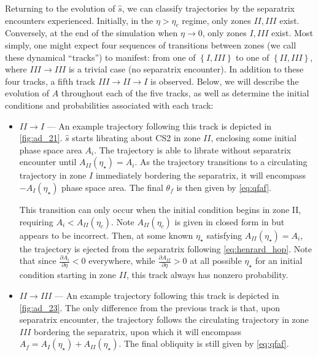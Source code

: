 \documentclass[
        fleqn,
        usenatbib,
    ]{mnras}
\newcommand*{\pd}[2]{\frac{\partial#1}{\partial#2}}
\newcommand*{\z}[1]{\left\{#1\right\}}
\begin{document}
Returning to the evolution of $\hat{s}$, we can classify trajectories by the
separatrix encounters experienced. Initially, in the $\eta > \eta_c$ regime,
only zones $II, III$ exist. Conversely, at the end of the simulation when $\eta
\to 0$, only zones $I, III$ exist. Most simply, one might expect four sequences
of transitions between zones (we call these dynamical ``tracks'') to manifest:
from one of $\z{I, III}$ to one of $\z{II, III}$, where $III \to III$ is a
trivial case (no separatrix encounter). In addition to these four tracks, a
fifth track $III \to II \to I$ is observed. Below, we will describe the
evolution of $A$ throughout each of the five tracks, as well as determine the
initial conditions and probabilities associated with each track:
\begin{itemize}
    \item $II \to I$ --- An example trajectory following this track is depicted
        in \autoref{fig:ad_21}. $\hat{s}$ starts librating about CS2 in zone
        $II$, enclosing some initial phase space area $A_i$. The trajectory is
        able to librate without separatrix encounter until $A_{II}(\eta_\star) =
        A_i$. As the trajectory transitions to a circulating trajectory in zone
        $I$ immediately bordering the separatrix, it will encompass
        $-A_I(\eta_\star)$ phase space area. The final $\theta_f$ is then given
        by \autoref{eq:qfaf}.

        This transition can only occur when the initial condition begins in zone
        II, requiring $A_i < A_{II}(\eta_c)$. Note $A_{II}(\eta_c)$ is given in
        closed form in \citealt{ward2004I} but appears to be incorrect. Then, at
        some known $\eta_\star$ satisfying $A_{II}(\eta_\star) = A_i$, the
        trajectory is ejected from the separatrix following
        \autoref{eq:henrard_hop}. Note that since $\pd{A_i}{\eta} < 0$
        everywhere, while $\pd{A_{II}}{\eta} > 0$ at all possible $\eta_\star$
        for an initial condition starting in zone $II$, this track always has
        nonzero probability.

    \item $II \to III$ --- An example trajectory following this track is
        depicted in \autoref{fig:ad_23}. The only difference from the previous
        track is that, upon separatrix encounter, the trajectory follows the
        circulating trajectory in zone $III$ bordering the separatrix, upon
        which it will encompass $A_f = A_I(\eta_\star) + A_{II}(\eta_\star)$.
        The final obliquity is still given by \autoref{eq:qfaf}.


\end{itemize}
\end{document}
